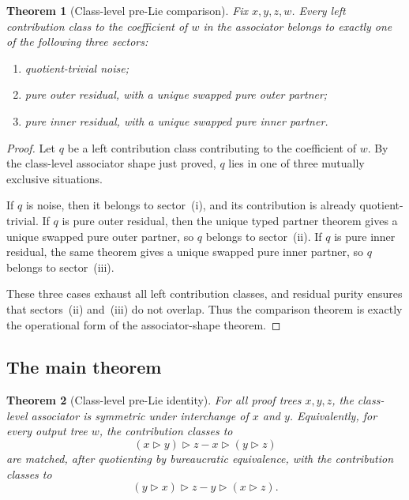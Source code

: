 \documentclass[11pt]{article}
\newtheorem{theorem}{Theorem}
\begin{document}
\begin{theorem}[Class-level pre-Lie comparison]
Fix \(x,y,z,w\). Every left contribution class to the coefficient of \(w\) in
the associator belongs to exactly one of the following three sectors:
\begin{enumerate}[label=\textup{(\roman*)}]
\item quotient-trivial noise;
\item pure outer residual, with a unique swapped pure outer partner;
\item pure inner residual, with a unique swapped pure inner partner.
\end{enumerate}
\end{theorem}

\begin{proof}
Let \(q\) be a left contribution class contributing to the coefficient of
\(w\). By the class-level associator shape just proved, \(q\) lies in one of
three mutually exclusive situations.

If \(q\) is noise, then it belongs to sector~(i), and its contribution is
already quotient-trivial. If \(q\) is pure outer residual, then the unique
typed partner theorem gives a unique swapped pure outer partner, so \(q\)
belongs to sector~(ii). If \(q\) is pure inner residual, the same theorem gives
a unique swapped pure inner partner, so \(q\) belongs to sector~(iii).

These three cases exhaust all left contribution classes, and residual purity
ensures that sectors~(ii) and~(iii) do not overlap. Thus the comparison theorem
is exactly the operational form of the associator-shape theorem.
\end{proof}

\subsection{The main theorem}

\begin{theorem}[Class-level pre-Lie identity]
For all proof trees \(x,y,z\), the class-level associator is symmetric under
interchange of \(x\) and \(y\). Equivalently, for every output tree \(w\), the
contribution classes to
\[
(x\triangleright y)\triangleright z - x\triangleright (y\triangleright z)
\]
are matched, after quotienting by bureaucratic equivalence, with the
contribution classes to
\[
(y\triangleright x)\triangleright z - y\triangleright (x\triangleright z).
\]
\end{theorem}
\end{document}
